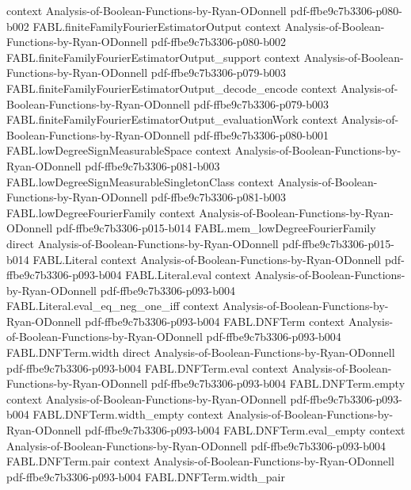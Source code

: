 \begin{theorem}
  {context}
  {Analysis-of-Boolean-Functions-by-Ryan-ODonnell}
  {pdf-ffbe9c7b3306-p080-b002}
\proofstep
  {FABL.finiteFamilyFourierEstimatorOutput}
  {context}
  {Analysis-of-Boolean-Functions-by-Ryan-ODonnell}
  {pdf-ffbe9c7b3306-p080-b002}
\proofstep
  {FABL.finiteFamilyFourierEstimatorOutput_support}
  {context}
  {Analysis-of-Boolean-Functions-by-Ryan-ODonnell}
  {pdf-ffbe9c7b3306-p079-b003}
\proofstep
  {FABL.finiteFamilyFourierEstimatorOutput_decode_encode}
  {context}
  {Analysis-of-Boolean-Functions-by-Ryan-ODonnell}
  {pdf-ffbe9c7b3306-p079-b003}
\proofstep
  {FABL.finiteFamilyFourierEstimatorOutput_evaluationWork}
  {context}
  {Analysis-of-Boolean-Functions-by-Ryan-ODonnell}
  {pdf-ffbe9c7b3306-p080-b001}
\proofstep
  {FABL.lowDegreeSignMeasurableSpace}
  {context}
  {Analysis-of-Boolean-Functions-by-Ryan-ODonnell}
  {pdf-ffbe9c7b3306-p081-b003}
\proofstep
  {FABL.lowDegreeSignMeasurableSingletonClass}
  {context}
  {Analysis-of-Boolean-Functions-by-Ryan-ODonnell}
  {pdf-ffbe9c7b3306-p081-b003}
\proofstep
  {FABL.lowDegreeFourierFamily}
  {context}
  {Analysis-of-Boolean-Functions-by-Ryan-ODonnell}
  {pdf-ffbe9c7b3306-p015-b014}
\proofstep
  {FABL.mem_lowDegreeFourierFamily}
  {direct}
  {Analysis-of-Boolean-Functions-by-Ryan-ODonnell}
  {pdf-ffbe9c7b3306-p015-b014}
\proofstep
  {FABL.Literal}
  {context}
  {Analysis-of-Boolean-Functions-by-Ryan-ODonnell}
  {pdf-ffbe9c7b3306-p093-b004}
\proofstep
  {FABL.Literal.eval}
  {context}
  {Analysis-of-Boolean-Functions-by-Ryan-ODonnell}
  {pdf-ffbe9c7b3306-p093-b004}
\proofstep
  {FABL.Literal.eval_eq_neg_one_iff}
  {context}
  {Analysis-of-Boolean-Functions-by-Ryan-ODonnell}
  {pdf-ffbe9c7b3306-p093-b004}
\proofstep
  {FABL.DNFTerm}
  {context}
  {Analysis-of-Boolean-Functions-by-Ryan-ODonnell}
  {pdf-ffbe9c7b3306-p093-b004}
\proofstep
  {FABL.DNFTerm.width}
  {direct}
  {Analysis-of-Boolean-Functions-by-Ryan-ODonnell}
  {pdf-ffbe9c7b3306-p093-b004}
\proofstep
  {FABL.DNFTerm.eval}
  {context}
  {Analysis-of-Boolean-Functions-by-Ryan-ODonnell}
  {pdf-ffbe9c7b3306-p093-b004}
\proofstep
  {FABL.DNFTerm.empty}
  {context}
  {Analysis-of-Boolean-Functions-by-Ryan-ODonnell}
  {pdf-ffbe9c7b3306-p093-b004}
\proofstep
  {FABL.DNFTerm.width_empty}
  {context}
  {Analysis-of-Boolean-Functions-by-Ryan-ODonnell}
  {pdf-ffbe9c7b3306-p093-b004}
\proofstep
  {FABL.DNFTerm.eval_empty}
  {context}
  {Analysis-of-Boolean-Functions-by-Ryan-ODonnell}
  {pdf-ffbe9c7b3306-p093-b004}
\proofstep
  {FABL.DNFTerm.pair}
  {context}
  {Analysis-of-Boolean-Functions-by-Ryan-ODonnell}
  {pdf-ffbe9c7b3306-p093-b004}
\proofstep
  {FABL.DNFTerm.width_pair}

\end{theorem}
